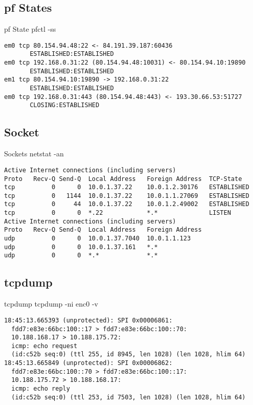\documentclass[14pt]{beamer}
\begin{document}
\subsection{pf States}
\begin{frame}[fragile]{pf State}
pfctl -ss
\scriptsize
\begin{verbatim}
em0 tcp 80.154.94.48:22 <- 84.191.39.187:60436
       ESTABLISHED:ESTABLISHED
em0 tcp 192.168.0.31:22 (80.154.94.48:10031) <- 80.154.94.10:19890
       ESTABLISHED:ESTABLISHED
em1 tcp 80.154.94.10:19890 -> 192.168.0.31:22
       ESTABLISHED:ESTABLISHED
em0 tcp 192.168.0.31:443 (80.154.94.48:443) <- 193.30.66.53:51727
       CLOSING:ESTABLISHED
\end{verbatim}
\end{frame}

\subsection{Socket}
\begin{frame}[fragile]{Sockets}
netstat -an
\scriptsize
\begin{verbatim}
Active Internet connections (including servers)
Proto   Recv-Q Send-Q  Local Address   Foreign Address  TCP-State
tcp          0      0  10.0.1.37.22    10.0.1.2.30176   ESTABLISHED
tcp          0   1144  10.0.1.37.22    10.0.1.1.27069   ESTABLISHED
tcp          0     44  10.0.1.37.22    10.0.1.2.49002   ESTABLISHED
tcp          0      0  *.22            *.*              LISTEN
Active Internet connections (including servers)
Proto   Recv-Q Send-Q  Local Address   Foreign Address
udp          0      0  10.0.1.37.7040  10.0.1.1.123
udp          0      0  10.0.1.37.161   *.*
udp          0      0  *.*             *.*
\end{verbatim}
\end{frame}

\subsection{tcpdump}
\begin{frame}[fragile]{tcpdump}
tcpdump -ni enc0 -v
\scriptsize
\begin{verbatim}
18:45:13.665393 (unprotected): SPI 0x00006861:
  fdd7:e83e:66bc:100::17 > fdd7:e83e:66bc:100::70:
  10.188.168.17 > 10.188.175.72:
  icmp: echo request
  (id:c52b seq:0) (ttl 255, id 8945, len 1028) (len 1028, hlim 64)
18:45:13.665849 (unprotected): SPI 0x00006862:
  fdd7:e83e:66bc:100::70 > fdd7:e83e:66bc:100::17:
  10.188.175.72 > 10.188.168.17:
  icmp: echo reply
  (id:c52b seq:0) (ttl 253, id 7503, len 1028) (len 1028, hlim 64)
\end{verbatim}
\end{frame}
\end{document}
